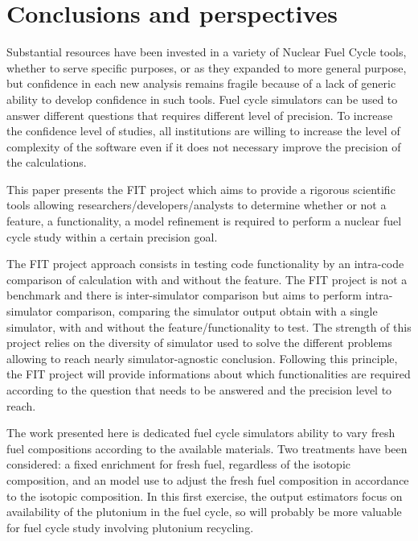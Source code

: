 \section{Conclusions and perspectives}

Substantial resources have been invested in a variety of Nuclear Fuel Cycle
tools, whether to serve specific purposes, or as they expanded to more general
purpose, but confidence in each new analysis remains fragile because of a lack
of generic ability to develop confidence in such tools.
Fuel cycle simulators can be used to answer different questions that requires
different level of precision. To increase the confidence level of studies, all
institutions are willing to increase the level of complexity of the software
even if it does not necessary improve the precision of the calculations. 

This paper presents the FIT project which aims to provide a rigorous scientific
tools allowing researchers/developers/analysts to determine whether or not a
feature, a functionality, a model refinement is required to perform a nuclear
fuel cycle study within a certain precision goal.

The FIT project approach consists in testing code functionality by an intra-code
comparison of calculation with and without the feature. The FIT project is not a
benchmark and there is inter-simulator comparison but aims to perform
intra-simulator comparison, comparing the simulator output obtain with a single
simulator, with and without the feature/functionality to test. The strength of
this project relies on the diversity of simulator used to solve the different
problems allowing to reach nearly simulator-agnostic conclusion. Following this
principle, the FIT project will provide informations about which functionalities
are required according to the question that needs to be answered and the
precision level to reach.

The work presented here is dedicated fuel cycle simulators ability to vary fresh
fuel compositions according to the available materials. Two treatments have been
considered: a fixed enrichment for fresh fuel, regardless of the isotopic
composition, and an model use to adjust the fresh fuel composition in accordance
to the isotopic composition. In this first exercise, the output estimators focus
on availability of the plutonium in the fuel cycle, so will probably be more
valuable for fuel cycle study involving plutonium recycling.

